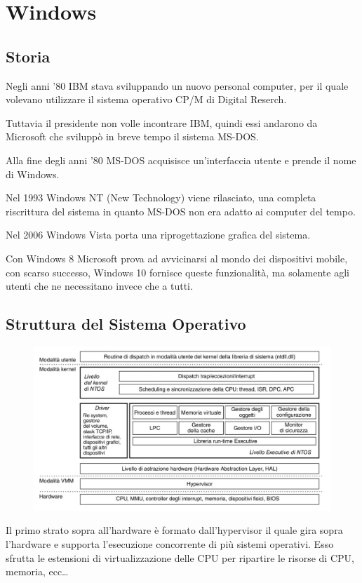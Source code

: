 \section{Windows}
\subsection{Storia}
Negli anni '80 IBM stava sviluppando un nuovo personal computer, per il quale volevano utilizzare il sistema operativo CP/M di Digital Reserch.

Tuttavia il presidente non volle incontrare IBM, quindi essi andarono da Microsoft che sviluppò in breve tempo il sistema MS-DOS.

\spacer
Alla fine degli anni '80 MS-DOS acquisisce un'interfaccia utente e prende il nome di Windows.

\spacer
Nel 1993 Windows NT (New Technology) viene rilasciato, una completa riscrittura del sistema in quanto MS-DOS non era adatto ai computer del tempo.

\spacer
Nel 2006 Windows Vista porta una riprogettazione grafica del sistema.

\spacer
Con Windows 8 Microsoft prova ad avvicinarsi al mondo dei dispositivi mobile, con scarso successo, Windows 10 fornisce queste funzionalità, ma solamente agli utenti che ne necessitano invece che a tutti.

\subsection{Struttura del Sistema Operativo}

\begin{figure}[H]
    \centering
    \includegraphics[width=0.75\linewidth]{assets/Windows-structure.png}
\end{figure}

Il primo strato sopra all'hardware è formato dall'hypervisor il quale gira sopra l'hardware e supporta l'esecuzione concorrente di più sistemi operativi.
Esso sfrutta le estensioni di virtualizzazione delle CPU per ripartire le risorse di CPU, memoria, ecc\dots

